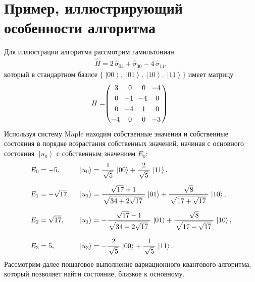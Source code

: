 \documentclass[a4paper]{report}
\newcommand{\ket}[1] {\!\!\;\ensuremath{\left|#1\right\rangle}}
\begin{document}
\section{Пример, иллюстрирующий особенности алгоритма}


Для иллюстрации алгоритма рассмотрим гамильтониан
\begin{align}\label{H}
\hat{H} = 2\,\hat{\sigma}_{03} + \hat{\sigma}_{30} - 4\,\hat{\sigma}_{11},
\end{align}
который в стандартном базисе $\big\{\ket{00}, \ket{01}, \ket{10}, \ket{11}\!\big\}$ имеет матрицу
\begin{equation}\label{}
H=
\!\!\left(\!
\begin{array}{cccc}
3& 0& 0& \!\!-4 \vphantom{\hat{A}}  \\[2pt]
0& \!\!-1& \!\!-4& 0 \vphantom{\hat{A}}  \\[2pt]
0& \!\!-4& 1& 0 \vphantom{\hat{A}}  \\[2pt]
\!\!-4& 0& 0& \!\!-3 \vphantom{\hat{A}}
\end{array}
\!\!\right).\nonumber
\end{equation}
Используя систему Maple находим собственные значения и собственные состояния в порядке возрастания собственных значений, начиная с основного состояния $\ket{u_0}$ с собственным значением $E_0$:
\begin{align}
E_0&= -5,\; &&\ket{u_0}= \frac{1}{\,\sqrt{5}\,}\,\ket{00}+ \frac{2}{\,\sqrt{5}\,}\,\ket{11}, \label{E0-u0}\\
E_1&= -\sqrt{17},\;\vphantom{\int\limits^A} &&\ket{u_1}= \frac{\sqrt{17}+1}{\,\sqrt{34+2\sqrt{17}\,}\,}\,\ket{01}+ \frac{\sqrt{8}}{\,\sqrt{17+\sqrt{17}\,}\,}\,\ket{10}, \label{E1-u1}\\
E_2&= \sqrt{17},\;\vphantom{\int\limits^A} &&\ket{u_1}= -\frac{\sqrt{17}-1}{\,\sqrt{34-2\sqrt{17}\,}\,}\,\ket{01}+ \frac{\sqrt{8}}{\,\sqrt{17-\sqrt{17}\,}\,}\,\ket{10}, \label{E2-u2}\\
E_3&= 5,\;\vphantom{\int\limits^A} &&\ket{u_3}= -\frac{2}{\,\sqrt{5}\,}\,\ket{00}+ \frac{1}{\,\sqrt{5}\,}\,\ket{11}. \label{E3-u3}
\end{align}
Рассмотрим далее пошаговое выполнение вариационного квантового алгоритма, который позволяет найти состояние, близкое к основному.
\end{document}

